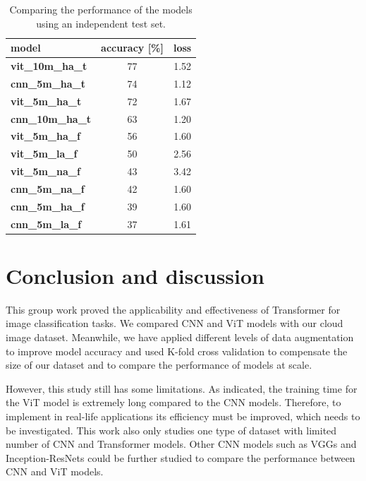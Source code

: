 \documentclass{article}
\begin{document}
\begin{table}[]
\centering
\caption{Comparing the performance of the models using an independent test set.\label{tab:test_comp}}
\begin{tabular}{|l|c|c|}
\hline
\textbf{model} & \textbf{accuracy [\%]} & \textbf{loss} \\ \hline \hline
\textbf{vit\_10m\_ha\_t} & \num{77}                              & \num{1.52}                          \\
\textbf{cnn\_5m\_ha\_t}  & \num{74}                              & \num{1.12}                          \\
\textbf{vit\_5m\_ha\_t}  & \num{72}                              & \num{1.67}                          \\
\textbf{cnn\_10m\_ha\_t} & \num{63}                              & \num{1.20}     \\
\textbf{vit\_5m\_ha\_f}  & \num{56}                              & \num{1.60} \\
\textbf{vit\_5m\_la\_f}  & \num{50}                             & \num{2.56} \\
\textbf{vit\_5m\_na\_f}  & \num{43}                              & \num{3.42} \\
\textbf{cnn\_5m\_na\_f}  & \num{42}                              & \num{1.60} \\
\textbf{cnn\_5m\_ha\_f}  & \num{39}                              & \num{1.60} \\
\textbf{cnn\_5m\_la\_f}  & \num{37}                              & \num{1.61}
 \\ \hline
\end{tabular}
\end{table}

\section{Conclusion and discussion}
This group work proved the applicability and effectiveness of Transformer for image classification tasks. We compared CNN and ViT models with our cloud image dataset. Meanwhile, we have applied different levels of data augmentation to improve model accuracy and used K-fold cross validation to compensate the size of our dataset and to compare the performance of models at scale. 

However, this study still has some limitations. As indicated, the training time for the ViT model is extremely long compared to the CNN models. Therefore, to implement in real-life applications its efficiency must be improved, which needs to be investigated. This work also only studies one type of dataset with limited number of CNN and Transformer models. Other CNN models such as VGGs and Inception-ResNets could be further studied to compare the performance between CNN and ViT models. 


	
\end{document}
